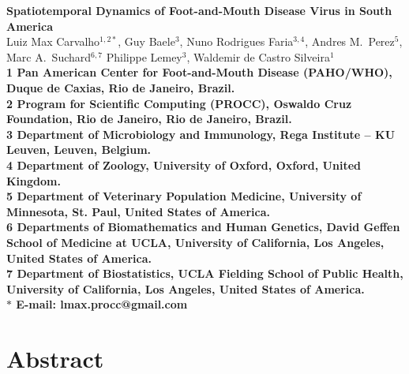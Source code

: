 \documentclass[10pt]{article}
\date{}
\begin{document}
\begin{flushleft}
{\Large
\textbf{Spatiotemporal Dynamics of Foot-and-Mouth Disease Virus in South America}
}
\\
Luiz Max Carvalho$^{1,2\ast}$,
Guy Baele$^{3}$,
Nuno Rodrigues Faria$^{3,4}$,
Andres M.~Perez$^{5}$,
Marc A.~Suchard$^{6,7}$
Philippe Lemey$^{3}$,
Waldemir de Castro Silveira$^{1}$
\\
\bf{1} Pan American Center for Foot-and-Mouth Disease (PAHO/WHO), Duque de Caxias, Rio de Janeiro, Brazil.
\\
\bf{2} Program for Scientific Computing (PROCC), Oswaldo Cruz Foundation, Rio de Janeiro, Rio de Janeiro, Brazil.
\\
\bf{3} Department of Microbiology and Immunology, Rega Institute -- KU Leuven, Leuven, Belgium.
\\
\bf{4} Department of Zoology, University of Oxford, Oxford, United Kingdom.
\\
\bf{5} Department of Veterinary Population Medicine, University of Minnesota, St. Paul, United States of America.
\\
\bf{6} Departments of Biomathematics and Human Genetics, David Geffen School of Medicine at UCLA, University of California, Los Angeles,  United States of America.\\
\bf{7} Department of Biostatistics, UCLA Fielding School of Public Health, University of California, Los Angeles,  United States of America.
\\
$\ast$ E-mail: lmax.procc@gmail.com
\end{flushleft}
\section*{Abstract}
\end{document}
